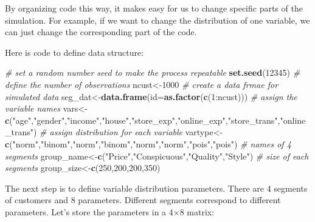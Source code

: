 \documentclass[]{book}
\newenvironment{Shaded}{\begin{snugshade}}{\end{snugshade}}
\newcommand{\KeywordTok}[1]{\textcolor[rgb]{0.13,0.29,0.53}{\textbf{{#1}}}}
\newcommand{\DataTypeTok}[1]{\textcolor[rgb]{0.13,0.29,0.53}{{#1}}}
\newcommand{\DecValTok}[1]{\textcolor[rgb]{0.00,0.00,0.81}{{#1}}}
\newcommand{\StringTok}[1]{\textcolor[rgb]{0.31,0.60,0.02}{{#1}}}
\newcommand{\CommentTok}[1]{\textcolor[rgb]{0.56,0.35,0.01}{\textit{{#1}}}}
\newcommand{\NormalTok}[1]{{#1}}
\theoremstyle{definition}
\theoremstyle{definition}
\theoremstyle{remark}
\begin{document}
By organizing code this way, it makes easy for us to change specific
parts of the simulation. For example, if we want to change the
distribution of one variable, we can just change the corresponding part
of the code.

Here is code to define data structure:

\begin{Shaded}
\begin{Highlighting}[]
\CommentTok{# set a random number seed to make the process repeatable}
\KeywordTok{set.seed}\NormalTok{(}\DecValTok{12345}\NormalTok{)}
\CommentTok{# define the number of observations}
\NormalTok{ncust<-}\DecValTok{1000}
\CommentTok{# create a data frmae for simulated data}
\NormalTok{seg_dat<-}\KeywordTok{data.frame}\NormalTok{(}\DataTypeTok{id=}\KeywordTok{as.factor}\NormalTok{(}\KeywordTok{c}\NormalTok{(}\DecValTok{1}\NormalTok{:ncust)))}
\CommentTok{# assign the variable names}
\NormalTok{vars<-}\KeywordTok{c}\NormalTok{(}\StringTok{"age"}\NormalTok{,}\StringTok{"gender"}\NormalTok{,}\StringTok{"income"}\NormalTok{,}\StringTok{"house"}\NormalTok{,}\StringTok{"store_exp"}\NormalTok{,}\StringTok{"online_exp"}\NormalTok{,}\StringTok{"store_trans"}\NormalTok{,}\StringTok{"online_trans"}\NormalTok{)}
\CommentTok{# assign distribution for each variable}
\NormalTok{vartype<-}\KeywordTok{c}\NormalTok{(}\StringTok{"norm"}\NormalTok{,}\StringTok{"binom"}\NormalTok{,}\StringTok{"norm"}\NormalTok{,}\StringTok{"binom"}\NormalTok{,}\StringTok{"norm"}\NormalTok{,}\StringTok{"norm"}\NormalTok{,}\StringTok{"pois"}\NormalTok{,}\StringTok{"pois"}\NormalTok{)}
\CommentTok{# names of 4 segments}
\NormalTok{group_name<-}\KeywordTok{c}\NormalTok{(}\StringTok{"Price"}\NormalTok{,}\StringTok{"Conspicuous"}\NormalTok{,}\StringTok{"Quality"}\NormalTok{,}\StringTok{"Style"}\NormalTok{)}
\CommentTok{# size of each segments}
\NormalTok{group_size<-}\KeywordTok{c}\NormalTok{(}\DecValTok{250}\NormalTok{,}\DecValTok{200}\NormalTok{,}\DecValTok{200}\NormalTok{,}\DecValTok{350}\NormalTok{)}
\end{Highlighting}
\end{Shaded}

The next step is to define variable distribution parameters. There are 4
segments of customers and 8 parameters. Different segments correspond to
different parameters. Let's store the parameters in a 4×8 matrix:
\end{document}
